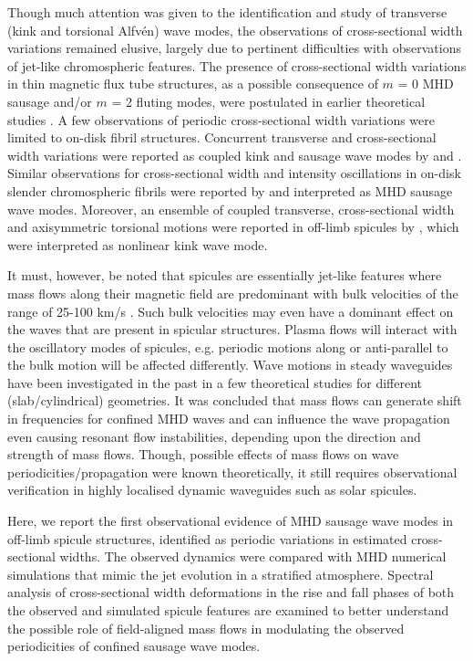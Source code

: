 \documentclass[12pt]{ociamthesis}
\begin{document}
Though much attention was given to the identification and study of transverse (kink and torsional Alfv\'en) wave modes, the observations of cross-sectional width variations remained elusive, largely due to pertinent difficulties with observations of jet-like chromospheric features. The presence of cross-sectional width variations in thin magnetic flux tube structures, as a possible consequence of $m$ = 0 MHD sausage and/or $m$ = 2 fluting modes, were postulated in earlier theoretical studies \citep{Ziegler1997a, Ziegler1997, Ruderman2010}. A few observations of periodic cross-sectional width variations were limited to on-disk fibril structures. Concurrent transverse and cross-sectional width variations were reported as coupled kink and sausage wave modes by \citet{Jess2012} and \citet{Morton2012}. Similar observations for cross-sectional width and intensity oscillations in on-disk slender chromospheric fibrils were reported by \citet{Gafeira2017} and interpreted as MHD sausage wave modes. Moreover, an ensemble of coupled transverse, cross-sectional width and axisymmetric torsional motions were reported in off-limb spicules by \citet{Sharma2018}, which were interpreted as nonlinear kink wave mode.

It must, however, be noted that spicules are essentially jet-like features where mass flows along their magnetic field are predominant with bulk velocities of the range of 25-100 km/s  \citep{Beckers1972ARAA1073B,Sterling2000SoPh19679S,Pereira2012}. Such bulk velocities may even have a dominant effect on the waves that are present in spicular structures. Plasma flows will interact with the oscillatory modes of spicules, e.g. periodic motions along or anti-parallel to the bulk motion will be affected differently. Wave motions in steady waveguides have been investigated in the past in a few theoretical studies \citep{Narayanan1991,nakariakov1995, terrahomem2003, soler2008} for different (slab/cylindrical) geometries. It was concluded that mass flows can generate shift in frequencies for confined MHD waves and can influence the wave propagation even causing resonant flow instabilities, depending upon the direction and strength of mass flows. Though, possible effects of mass flows on wave periodicities/propagation were known theoretically,  it still requires observational verification in highly localised dynamic waveguides such as solar spicules.

Here, we report the first observational evidence of MHD sausage wave modes in off-limb spicule structures, identified as periodic variations in estimated cross-sectional widths. The observed dynamics were compared with MHD numerical simulations that mimic the jet evolution in a stratified atmosphere. Spectral analysis of cross-sectional width deformations in the rise and fall phases of both the observed and simulated spicule features are examined to better understand the possible role of field-aligned mass flows in modulating the observed periodicities of confined sausage wave modes.  
\end{document}
